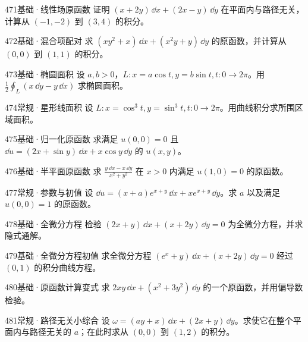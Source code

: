 \begin{exercise}{471}{基础·线性场原函数}
证明 $(x+2y)\,\dd x+(2x-y)\,\dd y$ 在平面内与路径无关，计算从 $(-1,-2)$ 到 $(3,4)$ 的积分。
\end{exercise}
\begin{exercise}{472}{基础·混合项配对}
求 $(xy^2+x)\,\dd x+(x^2y+y)\,\dd y$ 的原函数，并计算从 $(0,0)$ 到 $(1,1)$ 的积分。
\end{exercise}
\begin{exercise}{473}{基础·椭圆面积}
设 $a,b>0$，$L:x=a\cos t,y=b\sin t,t:0\to2\pi$。用 $\frac12\oint_L(x\,\dd y-y\,\dd x)$ 求椭圆面积。
\end{exercise}
\begin{exercise}{474}{常规·星形线面积}
设 $L:x=\cos^3t,y=\sin^3t,t:0\to2\pi$。用曲线积分求所围区域面积。
\end{exercise}
\begin{exercise}{475}{基础·归一化原函数}
求满足 $u(0,0)=0$ 且 $\dd u=(2x+\sin y)\,\dd x+x\cos y\,\dd y$ 的 $u(x,y)$。
\end{exercise}
\begin{exercise}{476}{基础·半平面原函数}
求 $\frac{y\,\dd x-x\,\dd y}{x^2+y^2}$ 在 $x>0$ 内满足 $u(1,0)=0$ 的原函数。
\end{exercise}
\begin{exercise}{477}{常规·参数与初值}
设 $\dd u=(x+a)e^{x+y}\,\dd x+xe^{x+y}\,\dd y$。求 $a$ 以及满足 $u(0,0)=1$ 的原函数。
\end{exercise}
\begin{exercise}{478}{基础·全微分方程}
检验 $(2x+y)\,\dd x+(x+2y)\,\dd y=0$ 为全微分方程，并求隐式通解。
\end{exercise}
\begin{exercise}{479}{基础·全微分方程初值}
求全微分方程 $(e^x+y)\,\dd x+(x+2y)\,\dd y=0$ 经过 $(0,1)$ 的积分曲线方程。
\end{exercise}
\begin{exercise}{480}{基础·原函数计算变式}
求 $2xy\,\dd x+(x^2+3y^2)\,\dd y$ 的一个原函数，并用偏导数检验。
\end{exercise}
\begin{exercise}{481}{常规·路径无关小综合}
设 $\omega=(ay+x)\,\dd x+(2x+y)\,\dd y$。求使它在整个平面内与路径无关的 $a$；在此时求从 $(0,0)$ 到 $(1,2)$ 的积分。
\end{exercise}
